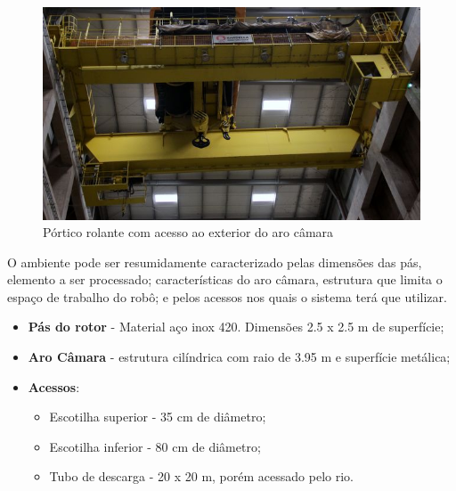 \begin{figure}[h!]	
	\centering
	\includegraphics[width=0.8\columnwidth]{sota/figs/viagem/img_4989}
	\caption{Pórtico rolante com acesso ao exterior do aro câmara}
	\label{fig::portico}
\end{figure}


O ambiente pode ser resumidamente caracterizado pelas dimensões das pás,
elemento a ser processado; características do aro câmara, estrutura que limita o
espaço de trabalho do robô; e pelos acessos nos quais o sistema terá que
utilizar.

\begin{itemize}
  \item \textbf{Pás do rotor} - Material aço inox 420. Dimensões 2.5 x 2.5 m de superfície;
  \item \textbf{Aro Câmara} - estrutura cilíndrica com raio de 3.95 m e
  superfície metálica;
  \item \textbf{Acessos}: 
  	\begin{itemize}
    	\item Escotilha superior - 35 cm de diâmetro;
  		\item Escotilha inferior - 80 cm de diâmetro;
  		\item Tubo de descarga - 20 x 20 m, porém acessado pelo rio. 
  	\end{itemize}
\end{itemize}






